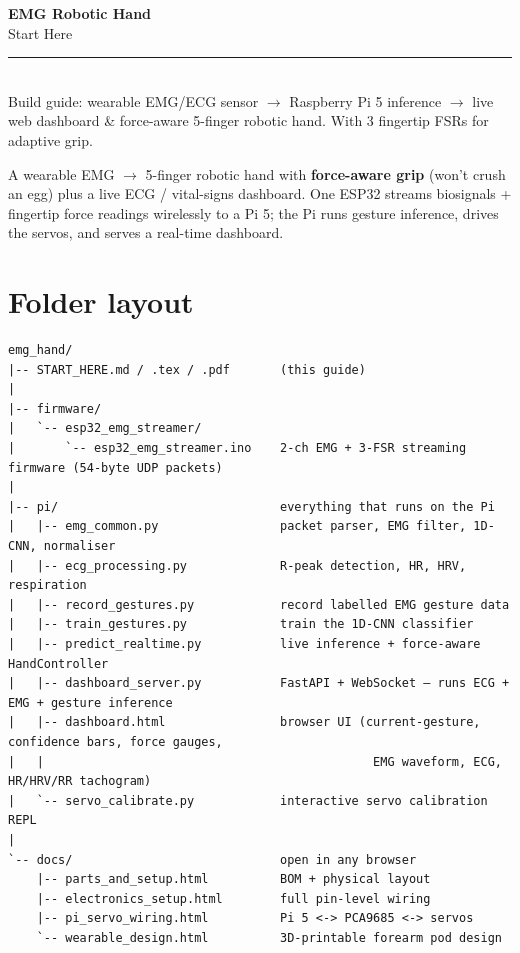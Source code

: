 \documentclass[10pt, a4paper]{article}
\begin{document}
\thispagestyle{empty}
\begin{flushleft}
  {\fontsize{30pt}{34pt}\selectfont\bfseries\color{ink}EMG Robotic Hand}\\[4pt]
  {\Large\color{muted}Start Here}\\[10pt]
  {\color{muted}\rule{\linewidth}{0.4pt}}\\[10pt]
  {\small\color{muted}Build guide: wearable EMG/ECG sensor $\rightarrow$ Raspberry Pi 5 inference $\rightarrow$ live web dashboard \& force-aware 5-finger robotic hand. With 3 fingertip FSRs for adaptive grip.}
\end{flushleft}
\vspace{12pt}

A wearable EMG $\rightarrow$ 5-finger robotic hand with \textbf{force-aware grip} (won't crush an egg) plus a live ECG / vital-signs dashboard. One ESP32 streams biosignals + fingertip force readings wirelessly to a Pi 5; the Pi runs gesture inference, drives the servos, and serves a real-time dashboard.

\section*{Folder layout}

\begin{lstlisting}[basicstyle=\ttfamily\scriptsize\color{codetext}]
emg_hand/
|-- START_HERE.md / .tex / .pdf       (this guide)
|
|-- firmware/
|   `-- esp32_emg_streamer/
|       `-- esp32_emg_streamer.ino    2-ch EMG + 3-FSR streaming firmware (54-byte UDP packets)
|
|-- pi/                               everything that runs on the Pi
|   |-- emg_common.py                 packet parser, EMG filter, 1D-CNN, normaliser
|   |-- ecg_processing.py             R-peak detection, HR, HRV, respiration
|   |-- record_gestures.py            record labelled EMG gesture data
|   |-- train_gestures.py             train the 1D-CNN classifier
|   |-- predict_realtime.py           live inference + force-aware HandController
|   |-- dashboard_server.py           FastAPI + WebSocket — runs ECG + EMG + gesture inference
|   |-- dashboard.html                browser UI (current-gesture, confidence bars, force gauges,
|   |                                              EMG waveform, ECG, HR/HRV/RR tachogram)
|   `-- servo_calibrate.py            interactive servo calibration REPL
|
`-- docs/                             open in any browser
    |-- parts_and_setup.html          BOM + physical layout
    |-- electronics_setup.html        full pin-level wiring
    |-- pi_servo_wiring.html          Pi 5 <-> PCA9685 <-> servos
    `-- wearable_design.html          3D-printable forearm pod design
\end{lstlisting}
\end{document}
